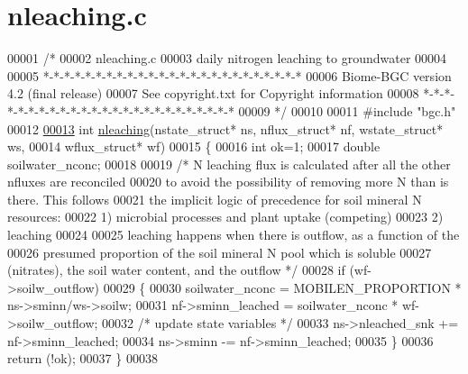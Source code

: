 \hypertarget{nleaching_8c_source}{}\section{nleaching.\+c}
\label{nleaching_8c_source}

\begin{DoxyCode}
00001 \textcolor{comment}{/* }
00002 \textcolor{comment}{nleaching.c}
00003 \textcolor{comment}{daily nitrogen leaching to groundwater}
00004 \textcolor{comment}{}
00005 \textcolor{comment}{*-*-*-*-*-*-*-*-*-*-*-*-*-*-*-*-*-*-*-*-*-*-*-*-*}
00006 \textcolor{comment}{Biome-BGC version 4.2 (final release)}
00007 \textcolor{comment}{See copyright.txt for Copyright information}
00008 \textcolor{comment}{*-*-*-*-*-*-*-*-*-*-*-*-*-*-*-*-*-*-*-*-*-*-*-*-*}
00009 \textcolor{comment}{*/}
00010 
00011 \textcolor{preprocessor}{#include "bgc.h"}
00012 
\hypertarget{nleaching_8c_source_l00013}{}\hyperlink{nleaching_8c_ad81692b3f3f9e1a81bb29c1d0ce6bd3d}{00013} \textcolor{keywordtype}{int} \hyperlink{nleaching_8c_ad81692b3f3f9e1a81bb29c1d0ce6bd3d}{nleaching}(nstate\_struct* ns, nflux\_struct* nf, wstate\_struct* ws, 
00014 wflux\_struct* wf)
00015 \{
00016     \textcolor{keywordtype}{int} ok=1;
00017     \textcolor{keywordtype}{double} soilwater\_nconc;
00018     
00019     \textcolor{comment}{/* N leaching flux is calculated after all the other nfluxes are reconciled}
00020 \textcolor{comment}{    to avoid the possibility of removing more N than is there. This follows}
00021 \textcolor{comment}{    the implicit logic of precedence for soil mineral N resources:}
00022 \textcolor{comment}{    1) microbial processes and plant uptake (competing)}
00023 \textcolor{comment}{    2) leaching}
00024 \textcolor{comment}{    }
00025 \textcolor{comment}{    leaching happens when there is outflow, as a function of the}
00026 \textcolor{comment}{    presumed proportion of the soil mineral N pool which is soluble}
00027 \textcolor{comment}{    (nitrates), the soil water content, and the outflow */}
00028     \textcolor{keywordflow}{if} (wf->soilw\_outflow)
00029     \{
00030         soilwater\_nconc = MOBILEN\_PROPORTION * ns->sminn/ws->soilw;
00031         nf->sminn\_leached = soilwater\_nconc * wf->soilw\_outflow;
00032         \textcolor{comment}{/* update state variables */}
00033         ns->nleached\_snk += nf->sminn\_leached;
00034         ns->sminn        -= nf->sminn\_leached;
00035     \}
00036     \textcolor{keywordflow}{return} (!ok);
00037 \}
00038 
\end{DoxyCode}
